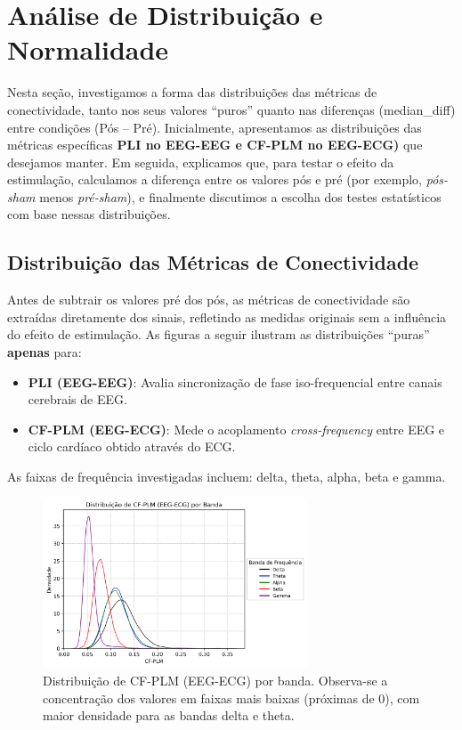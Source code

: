 \chapter{Análise de Distribuição e Normalidade}
\label{chap:analise_distribuicao_normalidade}

Nesta seção, investigamos a forma das distribuições das métricas de conectividade, tanto nos seus valores “puros” quanto nas diferenças (median\_diff) entre condições (Pós – Pré). Inicialmente, apresentamos as distribuições das métricas específicas \textbf{PLI no EEG-EEG e CF-PLM no EEG-ECG)} que desejamos manter. Em seguida, explicamos que, para testar o efeito da estimulação, calculamos a diferença entre os valores pós e pré (por exemplo, \emph{pós-sham} menos \emph{pré-sham}), e finalmente discutimos a escolha dos testes estatísticos com base nessas distribuições.

\section{Distribuição das Métricas de Conectividade}

Antes de subtrair os valores pré dos pós, as métricas de conectividade são extraídas diretamente dos sinais, refletindo as medidas originais sem a influência do efeito de estimulação. As figuras a seguir ilustram as distribuições “puras” \textbf{apenas} para:

\begin{itemize}
    \item \textbf{PLI (EEG-EEG)}: Avalia sincronização de fase iso-frequencial entre canais cerebrais de EEG.
    \item \textbf{CF-PLM (EEG-ECG)}: Mede o acoplamento \emph{cross-frequency} entre EEG e ciclo cardíaco obtido através do ECG.
\end{itemize}

\noindent As faixas de frequência investigadas incluem: delta, theta, alpha, beta e gamma.

\begin{figure}[htb]
    \centering
    \includegraphics[width=0.7\textwidth]{figs/3_1_connectivity_metrics/Distribuição_de_CF-PLM_(EEG-ECG)_por_Banda.png}
    \caption{Distribuição de CF-PLM (EEG-ECG) por banda. Observa-se a concentração dos valores em faixas mais baixas (próximas de 0), com maior densidade para as bandas delta e theta.}
    \label{fig:cfplm_eeg_ecg}
\end{figure}

